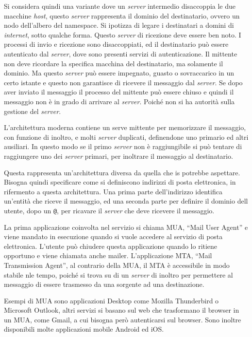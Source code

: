 \documentclass{article}
\numberwithin{equation}{subsection}
\begin{document}
Si considera quindi una variante dove un \textit{server} intermedio disaccoppia le due macchine \textit{host}, questo \textit{server} rappresenta il dominio del destinatario, ovvero un nodo dell'albero del namespace. 
Si ipotizza di legare i destinatari a domini di \textit{internet}, sotto qualche forma. Questo \textit{server} di ricezione deve essere ben noto. 
I processi di invio e ricezione sono disaccoppiati, ed il destinatario può essere autenticato dal \textit{server}, dove sono presenti servizi di autenticazione. Il mittente non deve ricordare la specifica macchina del destinatario, ma solamente il dominio. 
Ma questo \textit{server} può essere impegnato, guasto o sovraccarico in un certo istante e questo non garantisce di ricevere il messaggio dal \textit{server}. Se dopo aver inviato il messaggio il processo del mittente può essere chiuso e quindi il messaggio non è in grado di arrivare al \textit{server}. Poiché non si ha autorità sulla gestione del \textit{server}. 

L'architettura moderna contiene un serve mittente per memorizzare il messaggio, con funzione di inoltro, e molti \textit{server} duplicati, definendone uno primario ed altri 
ausiliari. In questo modo se il primo \textit{server} non è raggiungibile si può tentare di raggiungere uno dei \textit{server} primari, per inoltrare il messaggio al destinatario. 

Questa rappresenta un'architettura diversa da quella che \textcolor{Emerald}{is} potrebbe aspettare. Bisogna quindi specificare come si definiscono indirizzi di posta elettronica, in rifermento a questa architettura. Una prima parte dell'indirizzo identifica un'entità che riceve il messaggio, ed una seconda parte per definire il dominio dell utente, dopo un \verb|@|, per ricavare il \textit{server} che deve ricevere il messaggio. 

La prima applicazione coinvolta nel servizio si chiama MUA, ``Mail User Agent'' e viene mandato in esecuzione quando si vuole accedere al servizio di posta elettronica. L'utente può chiudere questa applicazione quando lo ritiene opportuno e viene chiamata anche mailer. 
L'applicazione MTA, ``Mail Transmission Agent'', al contrario della MUA, il MTA è accessibile in modo stabile nle tempo, poiché si trova su di un \textit{server} di inoltro per permettere al messaggio di essere trasmesso da una sorgente ad una destinazione. 

Esempi di MUA sono applicazioni Desktop come Mozilla Thunderbird o Microsoft Outlook, altri servizi si basano sul web che trasformano il browser in un MUA, come Gmail, a cui bisogna però autenticarsi sul browser. Sono inoltre disponibili molte applicazioni mobile Android ed iOS. 
\end{document}
